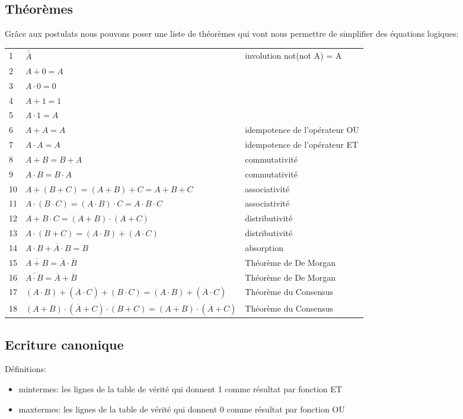 \subsection{Théorèmes}
Grâce aux postulats nous pouvons poser une liste de théorèmes qui vont nous permettre de simplifier des équations logiques:

\begin{center}
\begin{tabular}{p{1cm} p{8cm} p{5cm}} 
1&$\overline{\overline{A}}$ &involution not(not A) = A\\
2&$A + 0=A$ &\\
3&$A \cdot 0=0$ &\\
4&$A + 1=1$ &\\
5&$A \cdot 1=A$ &\\
6&$A + A=A$ &idempotence de l'opérateur OU\\
7&$A \cdot A=A$ &idempotence de l'opérateur ET\\
8&$A + B = B + A$ &commutativité\\
9&$A \cdot B=B \cdot A$ &commutativité\\
10&$A +(B + C) = (A + B)+ C = A+B+C$ &associativité\\
11&$A \cdot (B \cdot C)= (A \cdot B) \cdot C = A\cdot B\cdot C$ &associativité\\
12&$A + B \cdot C= (A + B) \cdot (A + C)$ &distributivité\\
13&$A \cdot (B + C)= (A \cdot B) + (A \cdot C)$ &distributivité\\
14&$A \cdot B + \overline{A} \cdot B = B$ &absorption\\
15&$\overline{A + B} = \overline{A} \cdot \overline{B}$ &Théorème de De Morgan\\
16&$\overline{A \cdot B} = \overline{A} + \overline{B}$ &Théorème de De Morgan\\
17&$(A \cdot B) + (\overline{A} \cdot C) + (B \cdot C) = (A \cdot B) + (\overline{A} \cdot C)$ &Théorème du Consensus\\
18&$(A + B) \cdot (\overline{A} + C) \cdot (B + C) = (A + B) \cdot (\overline{A} + C)$ &Théorème du Consensus\\
\end{tabular}
\end{center}

\subsection{Ecriture canonique}

Définitions:
\begin{itemize}[label=\textbullet,font=\small]
\item mintermes: les lignes de la table de vérité qui donnent 1 comme résultat par fonction ET
\item maxtermes: les lignes de la table de vérité qui donnent 0 comme résultat par fonction OU
\end{itemize}

